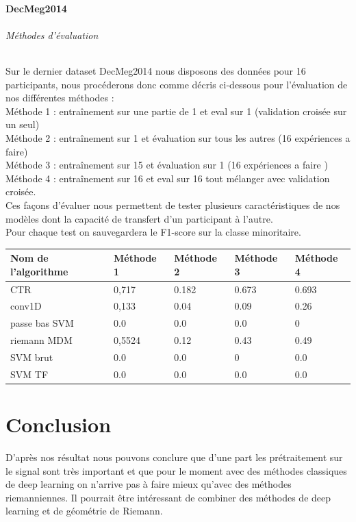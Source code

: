 \documentclass{article}[12pt]
\begin{document}
\subsection{DecMeg2014}

\paragraph{Méthodes d'évaluation}

Sur le dernier dataset DecMeg2014 nous disposons des données pour 16 participants, nous procéderons donc comme décris ci-dessous pour l'évaluation de nos différentes méthodes :\\
Méthode 1 : entraînement sur une partie de 1 et eval sur 1 (validation croisée sur un seul)\\
Méthode 2 : entraînement sur 1 et évaluation sur tous les autres (16 expériences a faire)\\
Méthode 3 : entraînement sur 15 et évaluation sur 1 (16 expériences a faire )\\
Méthode 4 : entraînement sur 16 et eval sur 16 tout mélanger avec validation croisée.
\\
Ces façons d'évaluer nous permettent de tester plusieurs caractéristiques de nos modèles dont la capacité de transfert d'un participant à l'autre.
\\
Pour chaque test on sauvegardera le F1-score sur la classe minoritaire.
\\
\begin{table}[H]
\begin{tabular}{|l|l|l|l|l|}
\hline
Nom de l’algorithme & Méthode 1         & Méthode 2           & Méthode 3          & Méthode 4          \\
\hline
CTR                 & 0,717 & 0.182 & 0.673 & 0.693 \\
conv1D              & 0,133         & 0.04                & 0.09               & 0.26               \\
passe bas SVM       & 0.0                & 0.0                   & 0.0                  & 0                  \\
riemann MDM         & 0,5524            & 0.12                & 0.43               & 0.49               \\
SVM brut            & 0.0                 & 0.0                   & 0                  & 0.0                  \\
SVM TF              & 0.0                 & 0.0                   & 0.0                  & 0.0      \\
\hline           
\end{tabular}
\end{table}

\part{Conclusion}
D'après nos résultat nous pouvons conclure que d'une part les prétraitement sur le signal sont très important et que pour le moment avec des méthodes classiques de deep learning on n'arrive pas à faire mieux qu'avec des méthodes riemanniennes. Il pourrait être intéressant de combiner des méthodes de deep learning et de géométrie de Riemann.

 
\end{document}
